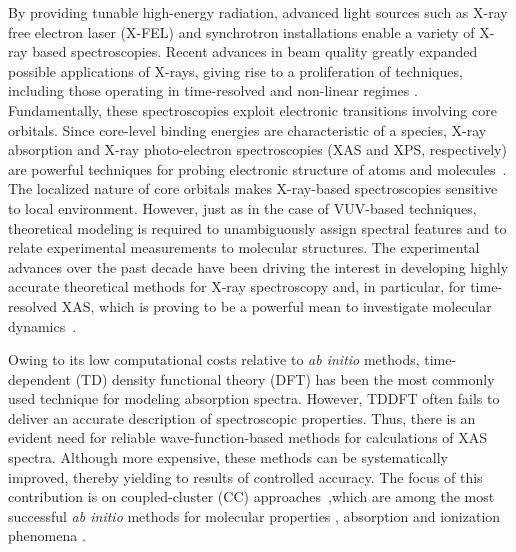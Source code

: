 \documentclass[journal=jctcce,manuscript=article]{achemso}
\begin{document}
By providing tunable high-energy radiation, advanced light sources
such as X-ray free electron laser (X-FEL) and synchrotron installations enable a variety of X-ray based spectroscopies\cite{Lamberti:XRay:2016,Mobilio:XRay:2014,Bergmann:FEL:17}.
Recent advances in beam quality greatly expanded possible applications of X-rays, giving rise to a proliferation of techniques, including those operating in time-resolved and non-linear
regimes \cite{Mobilio:XRay:2014,Lamberti:XRay:2016,Bergmann:FEL:17,Atto:Rev:17,Norman:ChemRev:18}.  
Fundamentally, these spectroscopies exploit electronic transitions involving core orbitals. 
Since core-level binding energies are characteristic of a species, X-ray absorption and
X-ray photo-electron spectroscopies (XAS and XPS, respectively) 
are powerful techniques for probing electronic structure of atoms and molecules~\cite{Stohr1992}.
The localized nature of core orbitals makes X-ray-based spectroscopies sensitive to local environment.  
However, just as in the case of VUV-based techniques\cite{Ahmed:ARPC:16},
theoretical modeling is required to unambiguously assign spectral features and to
relate experimental measurements to molecular structures. 
The experimental advances over the past decade have been driving the interest in developing highly accurate theoretical methods for X-ray spectroscopy and, in particular, for time-resolved XAS, which is proving to be a powerful mean to investigate molecular dynamics~\cite{Norman:ChemRev:18,naturecomm,Milne2014,kraus2018}.

Owing to its low computational costs relative to \textit{ab initio} methods, time-dependent (TD) density functional theory (DFT) has been the most commonly used technique 
for modeling absorption spectra\cite{Besley:CoreDFTPersp:10}.
However, TDDFT often fails to deliver an accurate description of spectroscopic properties. Thus, there is an evident need for reliable wave-function-based methods for calculations of XAS spectra. Although more expensive, these methods can be systematically improved, thereby yielding to
results of controlled accuracy\cite{OlsenText}. The focus of this contribution is on coupled-cluster (CC)
approaches~\cite{koch1990,Stanton:93:EOMCC,Christiansen_IJQC,krylov_eom_2008,WF_Properties_Review,CC_EOMCC_Bartlett,Christiansen2006,Christiansen:EOMRev:11},which are among the most successful \textit{ab initio} methods for molecular properties 
{\color{red}{and electronic spectra in the UV-vis region}}, 
{\color{red}{to describe}}  absorption and ionization phenomena {\color{red}{in the X-ray spectral region}}\cite{coriani2012jctc,Peng2015,coriani2012pra,coriani2015jcp,naturecomm}.
\end{document}
